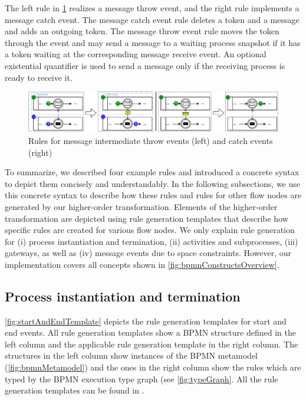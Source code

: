 \documentclass[submission, copyright, creativecommons]{eptcs}
\begin{document}
The left rule in \cref{fig:messageEventRules} realizes a message throw event, and the right rule implements a message catch event.
The message catch event rule deletes a token and a message and adds an outgoing token.
The message throw event rule moves the token through the event and may send a message to a waiting process snapshot if it has a token waiting at the corresponding message receive event.
An optional existential quantifier is used to send a message only if the receiving process is ready to receive it.

\begin{figure}[h]
    \centering
    \includegraphics[width=1\textwidth]{images/bpmn_semantics-message-events.pdf}
    \caption{Rules for message intermediate throw events (left) and catch events (right)}
    \label{fig:messageEventRules}
\end{figure}

To summarize, we described four example rules and introduced a concrete syntax to depict them concisely and understandably.
In the following subsections, we use this concrete syntax to describe how these rules and rules for other flow nodes are generated by our higher-order transformation.
Elements of the higher-order transformation are depicted using rule generation templates that describe how specific rules are created for various flow nodes.
We only explain rule generation for (i) process instantiation and termination, (ii) activities and subprocesses, (iii) gateways, as well as (iv) message events due to space constraints.
However, our implementation covers all concepts shown in \autoref{fig:bpmnConstructsOverview}.


\subsection{Process instantiation and termination} \label{subsec:instAndTermination}

\autoref{fig:startAndEndTemplate} depicts the rule generation templates for start and end events.
All rule generation templates show a BPMN structure defined in the left column and the applicable rule generation template in the right column.
The structures in the left column show instances of the BPMN metamodel (\autoref{fig:bpmnMetamodel}) and the ones in the right column show the rules which are typed by the BPMN execution type graph (see \autoref{fig:typeGraph}.
All the rule generation templates can be found in \cite{timkrauterArtifactsTERMGRAPH2022}.
\end{document}

